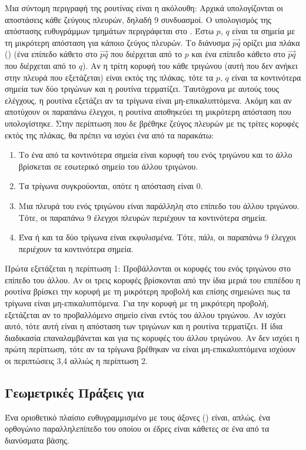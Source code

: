 Μια σύντομη περιγραφή της ρουτίνας είναι η ακόλουθη: 
Αρχικά υπολογίζονται οι αποστάσεις κάθε ζεύγους πλευρών,
δηλαδή 9 συνδυασμοί. 
Ο υπολογισμός της απόστασης ευθυγράμμων τμημάτων 
περιγράφεται στο \cite{lumelsky1985fast}.
Έστω $p$, $q$ είναι τα σημεία με τη μικρότερη απόσταση 
για κάποιο ζεύγος πλευρών.
Το διάνυσμα $\vec{pq}$ ορίζει μια πλάκα () (ένα επίπεδο 
κάθετο στο $\vec{pq}$ που διέρχεται από το $p$ και 
ένα επίπεδο κάθετο στο $\vec{pq}$ που διέρχεται
από το $q$).
Αν η τρίτη κορυφή του κάθε τριγώνου (αυτή που δεν ανήκει 
στην πλευρά που εξετάζεται) είναι εκτός της πλάκας, τότε 
τα $p$, $q$ είναι τα κοντινότερα σημεία των δύο τριγώνων
και η ρουτίνα τερματίζει.
Ταυτόχρονα με αυτούς τους ελέγχους, η ρουτίνα εξετάζει 
αν τα τρίγωνα είναι μη-επικαλυπτόμενα.
Ακόμη και αν αποτύχουν οι παραπάνω έλεγχοι, η ρουτίνα 
αποθηκεύει τη μικρότερη απόσταση που υπολογίστηκε.
Στην περίπτωση που δε βρέθηκε ζεύγος πλευρών με τις τρίτες 
κορυφές εκτός της πλάκας, θα πρέπει να ισχύει ένα από τα 
παρακάτω:
\begin{enumerate}
    \item Το ένα από τα κοντινότερα σημεία είναι κορυφή του 
    ενός τριγώνου και το άλλο βρίσκεται σε εσωτερικό σημείο 
    του άλλου τριγώνου.
    \item Τα τρίγωνα συγκρούονται, οπότε η απόσταση είναι 0.
    \item Μια πλευρά του ενός τριγώνου είναι παράλληλη στο 
    επίπεδο του άλλου τριγώνου. 
    Τότε, οι παραπάνω 9 έλεγχοι πλευρών περιέχουν τα κοντινότερα 
    σημεία.
    \item Ένα ή και τα δύο τρίγωνα είναι εκφυλισμένα. 
    Τότε, πάλι, οι παραπάνω 9 έλεγχοι περιέχουν τα κοντινότερα 
    σημεία.
\end{enumerate}

Πρώτα εξετάζεται η περίπτωση 1: 
Προβάλλονται οι κορυφές του ενός τριγώνου στο επίπεδο του 
άλλου. 
Αν οι τρεις κορυφές βρίσκονται από την ίδια μεριά του επιπέδου
η ρουτίνα βρίσκει την κορυφή με τη μικρότερη προβολή και επίσης 
σημειώνει πως τα τρίγωνα είναι μη-επικαλυπτόμενα.
Για την κορυφή με τη μικρότερη προβολή, εξετάζεται αν το προβαλλόμενο
σημείο είναι εντός του άλλου τριγώνου. 
Αν ισχύει αυτό, τότε αυτή είναι η απόσταση των τριγώνων και η 
ρουτίνα τερματίζει.
Η ίδια διαδικασία επαναλαμβάνεται και για τις κορυφές του άλλου τριγώνου.
Αν δεν ισχύει η πρώτη περίπτωση, τότε αν τα τρίγωνα βρέθηκαν να είναι 
μη-επικαλυπτόμενα ισχύουν οι περιπτώσεις 3,4 αλλιώς η περίπτωση 2.

\subsection{Γεωμετρικές Πράξεις για }
Ένα οριοθετικό πλαίσιο ευθυγραμμισμένο με τους άξονες ()
είναι, απλώς, ένα ορθογώνιο παραλληλεπίπεδο του οποίου οι 
έδρες είναι κάθετες σε ένα από τα διανύσματα βάσης.

